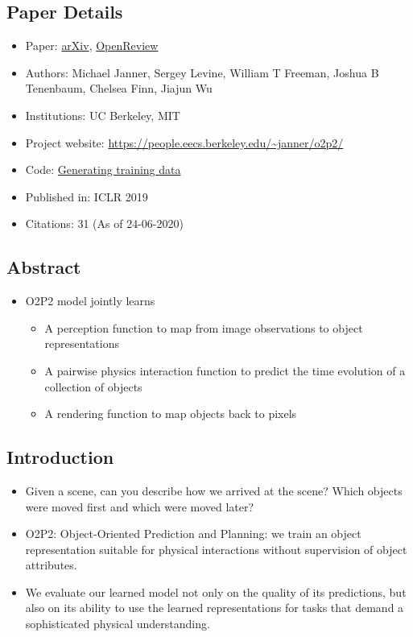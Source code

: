\documentclass{article}
\begin{document}
    \subsection*{Paper Details}
    \begin{itemize}
        \item Paper: \href{https://arxiv.org/abs/1812.10972}{arXiv}, \href{https://openreview.net/forum?id=HJx9EhC9tQ&noteId=Bkgyox9DnQ}{OpenReview}
        \item Authors: Michael Janner, Sergey Levine, William T Freeman, Joshua B Tenenbaum, Chelsea Finn, Jiajun Wu
        \item Institutions: UC Berkeley, MIT
        \item Project website: \url{https://people.eecs.berkeley.edu/~janner/o2p2/}
        \item Code: \href{https://github.com/JannerM/o2p2}{Generating training data}
        \item Published in: ICLR 2019
        \item Citations: 31 (As of 24-06-2020)
    \end{itemize}

    \subsection*{Abstract}
    \begin{itemize}
        \item O2P2 model jointly learns
        \begin{itemize}
            \item A perception function to map from image observations to object representations
            \item A pairwise physics interaction function to predict the time evolution of a collection of objects
            \item A rendering function to map objects back to pixels
        \end{itemize}
    \end{itemize}

    \subsection{Introduction}\label{subsec:Reasoning_about_Physical_Interactions_with_Object_Oriented_Prediction_and_Planning_(O2P2):introduction}
    \begin{itemize}
        \item Given a scene, can you describe how we arrived at the scene?
        Which objects were moved first and which were moved later?
        \item O2P2: Object-Oriented Prediction and Planning: we train an object representation suitable for physical interactions without supervision of object attributes.
        \item We evaluate our learned model not only on the quality of its predictions, but also on its ability to use the learned representations for tasks that demand a sophisticated physical understanding.
    \end{itemize}
\end{document}
